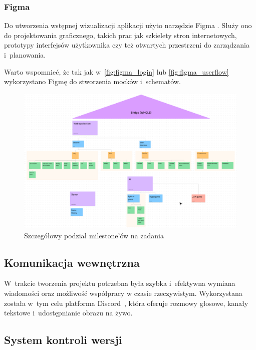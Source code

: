 \subsubsection{Figma}

Do utworzenia wstępnej wizualizacji aplikacji użyto narzędzie Figma \cite{Figma}.
Służy ono do projektowania graficznego, takich prac jak szkielety stron
internetowych, prototypy interfejsów użytkownika czy też otwartych przestrzeni
do zarządzania i~planowania.

Warto wspomnieć, że tak jak w~\ref{fig:figma_login} lub
\ref{fig:figma_userflow} wykorzystano Figmę do stworzenia mocków i~schematów.

\begin{figure}[h]
    \centering
    \includegraphics[width=\textwidth]{img/schematy/milestones.png}
    \caption{Szczegółowy podział milestone'ów na zadania}
\end{figure}

\FloatBarrier


\subsection{Komunikacja wewnętrzna}

W~trakcie tworzenia projektu potrzebna była szybka i~efektywna
wymiana wiadomości oraz możliwość współpracy w czasie rzeczywistym.
Wykorzystana została w~tym celu platforma Discord~\cite{Discord},
która oferuje rozmowy głosowe, kanały tekstowe i~udostępnianie
obrazu na żywo.

\subsection{System kontroli wersji}


